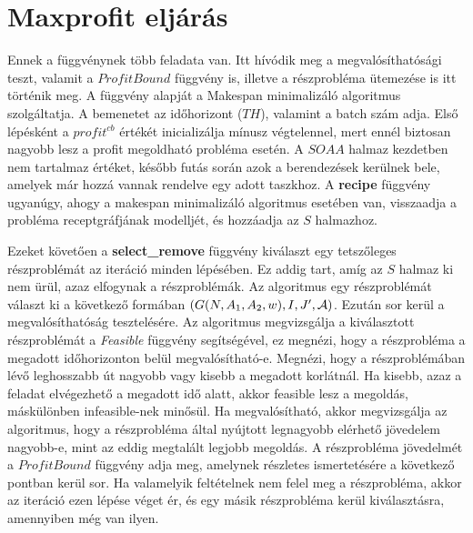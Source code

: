 \section{Maxprofit eljárás}
Ennek a függvénynek több feladata van.
Itt hívódik meg a megvalósíthatósági teszt, valamit a $ProfitBound$ függvény is, illetve a részprobléma ütemezése is itt történik meg.
A függvény alapját a Makespan minimalizáló algoritmus szolgáltatja.
A bemenetet az időhorizont ($TH$), valamint a batch szám adja.
Első lépésként a $profit^{cb}$ értékét inicializálja mínusz végtelennel, mert ennél biztosan nagyobb lesz a profit megoldható probléma esetén.
A $SOAA$ halmaz kezdetben nem tartalmaz értéket, később futás során azok a berendezések kerülnek bele, amelyek már hozzá vannak rendelve egy adott taszkhoz.
A \textbf{recipe} függvény ugyanúgy, ahogy a makespan minimalizáló algoritmus esetében van, visszaadja a probléma receptgráfjának modelljét, és hozzáadja az $S$ halmazhoz.

Ezeket követően a \textbf{select\_remove} függvény kiválaszt egy tetszőleges részproblémát az iteráció minden lépésében.
Ez addig tart, amíg az $S$ halmaz ki nem ürül, azaz elfogynak a részproblémák.
Az algoritmus egy részproblémát választ ki a következő formában $(G(N,A_1,A_2,w),I,J',{\cal A})$.
Ezután sor kerül a megvalósíthatóság tesztelésére.
Az algoritmus megvizsgálja a kiválasztott részproblémát a \textit{Feasible} függvény segítségével, ez megnézi, hogy a részprobléma a megadott időhorizonton belül megvalósítható-e.
Megnézi, hogy a részproblémában lévő leghosszabb út nagyobb vagy kisebb a megadott korlátnál.
Ha kisebb, azaz a feladat elvégezhető a megadott idő alatt, akkor feasible lesz a megoldás, máskülönben infeasible-nek minősül.
Ha megvalósítható, akkor megvizsgálja az algoritmus, hogy a részprobléma által nyújtott legnagyobb elérhető jövedelem nagyobb-e, mint az eddig megtalált legjobb megoldás.
A részprobléma jövedelmét a $ProfitBound$ függvény adja meg, amelynek részletes ismertetésére a következő pontban kerül sor.
Ha valamelyik feltételnek nem felel meg a részprobléma, akkor az iteráció ezen lépése véget ér, és egy másik részprobléma kerül kiválasztásra, amennyiben még van ilyen.

